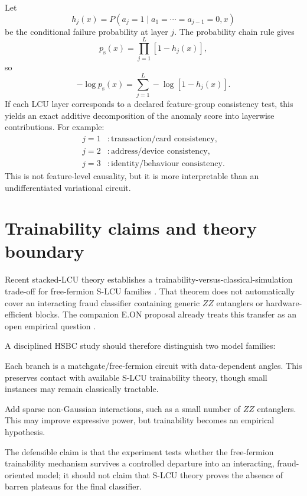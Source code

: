 \documentclass[11pt,a4paper]{article}
\newcommand{\psucc}{p_{\mathrm{s}}}
\begin{document}
Let
\begin{equation}
 h_j(x)
 =P(a_j=1\mid a_1=\cdots=a_{j-1}=0,x)
\end{equation}
be the conditional failure probability at layer $j$. The probability chain rule gives
\begin{equation}
    \psucc(x)=\prod_{j=1}^L[1-h_j(x)],
\end{equation}
so
\begin{equation}
\boxed{
    -\log\psucc(x)
    =\sum_{j=1}^L -\log[1-h_j(x)].
}
\end{equation}
If each LCU layer corresponds to a declared feature-group consistency test, this yields an exact additive decomposition of the anomaly score into layerwise contributions. For example:
\begin{align}
 j=1 &: \text{transaction/card consistency},\\
 j=2 &: \text{address/device consistency},\\
 j=3 &: \text{identity/behaviour consistency}.
\end{align}
This is not feature-level causality, but it is more interpretable than an undifferentiated variational circuit.

\section{Trainability claims and theory boundary}

Recent stacked-LCU theory establishes a trainability-versus-classical-simulation trade-off for free-fermion S-LCU families \cite{Khatri2026}. That theorem does not automatically cover an interacting fraud classifier containing generic $ZZ$ entanglers or hardware-efficient blocks. The companion E.ON proposal already treats this transfer as an open empirical question \cite{NguyenEON2026}.

A disciplined HSBC study should therefore distinguish two model families:
\begin{description}[leftmargin=2.4cm,style=nextline]
\item[Theory-anchored model] Each branch is a matchgate/free-fermion circuit with data-dependent angles. This preserves contact with available S-LCU trainability theory, though small instances may remain classically tractable.
\item[Application model] Add sparse non-Gaussian interactions, such as a small number of $ZZ$ entanglers. This may improve expressive power, but trainability becomes an empirical hypothesis.
\end{description}
The defensible claim is that the experiment tests whether the free-fermion trainability mechanism survives a controlled departure into an interacting, fraud-oriented model; it should not claim that S-LCU theory proves the absence of barren plateaus for the final classifier.
\end{document}
